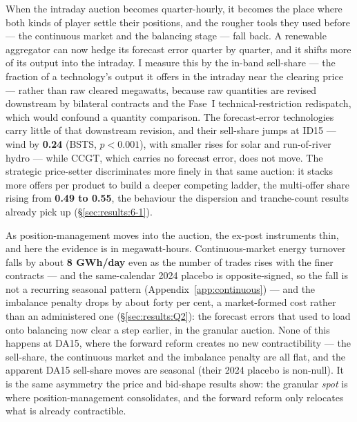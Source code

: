 \documentclass[11pt,a4paper]{article}
\theoremstyle{definition}
\theoremstyle{remark}
\theoremstyle{plain}
\begin{document}
When the intraday auction becomes quarter-hourly, it becomes the place where both kinds of player settle their positions, and the rougher tools they used before --- the continuous market and the balancing stage --- fall back.
 A renewable aggregator can now hedge its forecast error quarter by quarter, and it shifts more of its output into the intraday. I measure this by the in-band sell-share --- the fraction of a technology's output it offers in the intraday near the clearing price --- rather than raw cleared megawatts, because raw quantities are revised downstream by bilateral contracts and the Fase~I technical-restriction redispatch, which would confound a quantity comparison. The forecast-error technologies carry little of that downstream revision, and their sell-share jumps at ID15 --- wind by \textbf{0.24} (BSTS, $p<0.001$), with smaller rises for solar and run-of-river hydro --- while CCGT, which carries no forecast error, does not move.
 The strategic price-setter discriminates more finely in that same auction: it stacks more offers per product to build a deeper competing ladder, the multi-offer share rising from \textbf{0.49 to 0.55}, the behaviour the dispersion and tranche-count results already pick up (\S\ref{sec:results:6-1}).

As position-management moves into the auction, the ex-post instruments thin, and here the evidence is in megawatt-hours. Continuous-market energy turnover falls by about \textbf{8 GWh/day} even as the number of trades rises with the finer contracts --- and the same-calendar 2024 placebo is opposite-signed, so the fall is not a recurring seasonal pattern (Appendix~\ref{app:continuous}) --- and the imbalance penalty drops by about forty per cent, a market-formed cost rather than an administered one (\S\ref{sec:results:Q2}): the forecast errors that used to load onto balancing now clear a step earlier, in the granular auction.
  None of this happens at DA15, where the forward reform creates no new contractibility --- the sell-share, the continuous market and the imbalance penalty are all flat, and the apparent DA15 sell-share moves are seasonal (their 2024 placebo is non-null). It is the same asymmetry the price and bid-shape results show: the granular \emph{spot} is where position-management consolidates, and the forward reform only relocates what is already contractible.
\end{document}
